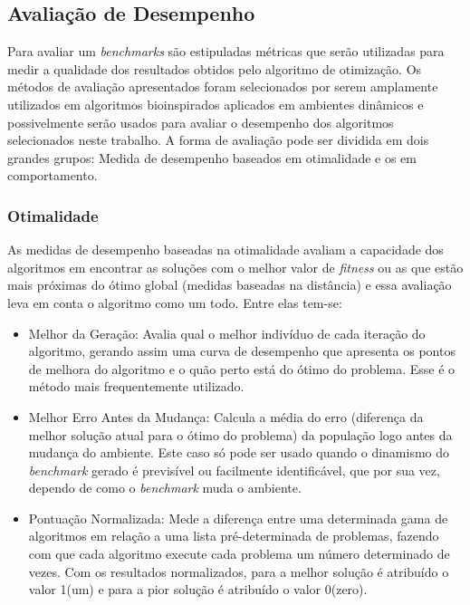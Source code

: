 \subsection{Avaliação de Desempenho}
\label{sec:perfermance_measures}

Para avaliar um \textit{benchmarks} são estipuladas métricas que serão utilizadas para medir a qualidade dos resultados obtidos pelo algoritmo de otimização. Os métodos de avaliação apresentados foram selecionados por serem amplamente utilizados em algoritmos bioinspirados aplicados em ambientes dinâmicos e possivelmente serão usados para avaliar o desempenho dos algoritmos selecionados neste trabalho.
A forma de avaliação pode ser dividida em dois grandes grupos: Medida de desempenho baseados em otimalidade e os em comportamento.

\subsubsection{Otimalidade}
As medidas de desempenho baseadas na otimalidade avaliam a capacidade dos algoritmos em encontrar as soluções com o melhor valor de \textit{fitness} ou as que estão mais próximas do ótimo global (medidas baseadas na distância) e essa avaliação leva em conta o algoritmo como um todo. Entre elas tem-se:

\begin{itemize}
\item Melhor da Geração: Avalia qual o melhor indivíduo de cada iteração do algoritmo, gerando assim uma curva de desempenho que apresenta os pontos de melhora do algoritmo e o quão perto está do ótimo do problema. Esse é o método mais frequentemente utilizado.

\item Melhor Erro Antes da Mudança: Calcula a média do erro (diferença da melhor solução atual para o ótimo do problema) da população logo antes da mudança do ambiente. Este caso só pode ser usado quando o dinamismo do \textit{benchmark} gerado é previsível ou facilmente identificável, que por sua vez, dependo de como o \textit{benchmark} muda o ambiente.

\item Pontuação Normalizada: Mede a diferença entre uma determinada gama de algoritmos em relação a uma lista pré-determinada de problemas, fazendo com que cada algoritmo execute cada problema um número determinado de vezes. Com os resultados normalizados, para a melhor solução é atribuído o valor 1(um) e para a pior solução é atribuído o valor 0(zero).
\end{itemize}

